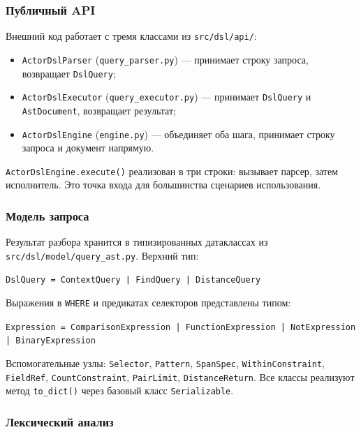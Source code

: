 \documentclass[a4paper,12pt]{article}
\begin{document}
\subsubsection{Публичный API}

Внешний код работает с тремя классами из \texttt{src/dsl/api/}:

\begin{itemize}
  \item \texttt{ActorDslParser} (\texttt{query\_parser.py}) --- принимает строку запроса, возвращает \texttt{DslQuery};
  \item \texttt{ActorDslExecutor} (\texttt{query\_executor.py}) --- принимает \texttt{DslQuery} и \texttt{AstDocument}, возвращает результат;
  \item \texttt{ActorDslEngine} (\texttt{engine.py}) --- объединяет оба шага, принимает строку запроса и документ напрямую.
\end{itemize}

\texttt{ActorDslEngine.execute()} реализован в три строки: вызывает парсер, затем исполнитель. Это точка входа для большинства сценариев использования.

\subsubsection{Модель запроса}

Результат разбора хранится в типизированных датаклассах из \\ \texttt{src/dsl/model/query\_ast.py}. Верхний тип:

\begin{center}
\texttt{DslQuery = ContextQuery | FindQuery | DistanceQuery}
\end{center}

Выражения в \texttt{WHERE} и предикатах селекторов представлены типом:

\begin{center}
\texttt{Expression = ComparisonExpression | FunctionExpression | NotExpression | BinaryExpression}
\end{center}

Вспомогательные узлы: \texttt{Selector}, \texttt{Pattern}, \texttt{SpanSpec}, \texttt{WithinConstraint}, \texttt{FieldRef}, \texttt{CountConstraint}, \texttt{PairLimit}, \texttt{DistanceReturn}. Все классы реализуют метод \texttt{to\_dict()} через базовый класс \texttt{Serializable}.

\subsubsection{Лексический анализ}
\end{document}
